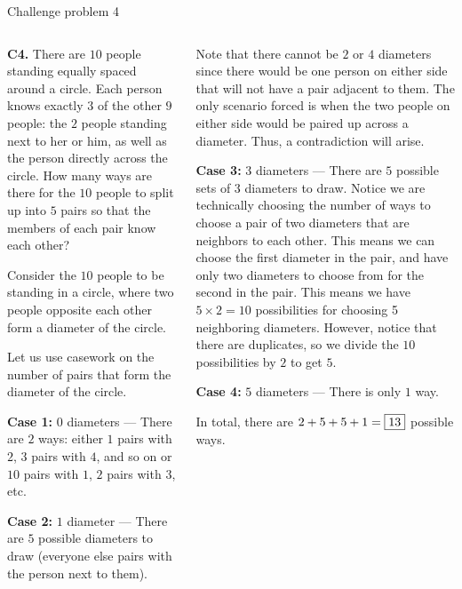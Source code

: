 \documentclass[9pt,aspectratio=169]{beamer}
\begin{document}
\begin{frame}{Challenge problem 4}
  \begin{columns}[T]
    \begin{column}{0.5\textwidth}
      \begin{problem}
        \textbf{C4.} There are $10$ people standing equally spaced around a circle. Each person knows exactly $3$ of the other $9$ people: the $2$ people standing next to her or him, as well as the person directly across the circle. How many ways are there for the $10$ people to split up into $5$ pairs so that the members of each pair know each other?
      \end{problem}

      Consider the $10$ people to be standing in a circle, where two people opposite each other form a diameter of the circle.

      Let us use casework on the number of pairs that form the diameter of the circle.

      \textbf{Case 1:} $0$ diameters ---
      There are $2$ ways: either $1$ pairs with $2$, $3$ pairs with $4$, and so on or $10$ pairs with $1$, $2$ pairs with $3$, etc.

      \textbf{Case 2:} $1$ diameter ---
      There are $5$ possible diameters to draw (everyone else pairs with the person next to them).
    \end{column}
    \begin{column}{0.5\textwidth}
      Note that there cannot be $2$ or $4$ diameters since there would be one person on either side that will not have a pair adjacent to them. The only scenario forced is when the two people on either side would be paired up across a diameter. Thus, a contradiction will arise.

      \textbf{Case 3:} $3$ diameters ---
      There are $5$ possible sets of $3$ diameters to draw. Notice we are technically choosing the number of ways to choose a pair of two diameters that are neighbors to each other. This means we can choose the first diameter in the pair, and have only two diameters to choose from for the second in the pair. This means we have $5\times 2=10$ possibilities for choosing 5 neighboring diameters. However, notice that there are duplicates, so we divide the $10$ possibilities by $2$ to get $5$.

      \textbf{Case 4:} $5$ diameters ---
      There is only $1$ way.

      In total, there are $2+5+5+1=\fbox{13}$ possible ways. 
    \end{column}
  \end{columns}
\end{frame}
\end{document}
